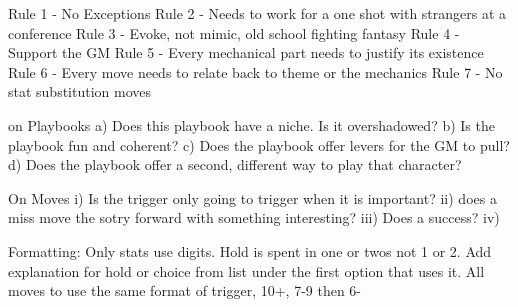 \documentclass{tufte-book}
\begin{document}
Rule 1 - No Exceptions
Rule 2 - Needs to work for a one shot with strangers at a conference
Rule 3 - Evoke, not mimic, old school fighting fantasy
Rule 4 - Support the GM
Rule 5 - Every mechanical part needs to justify its existence
Rule 6 - Every move needs to relate back to theme or the mechanics
Rule 7 - No stat substitution moves

on Playbooks
a) Does this playbook have a niche. Is it overshadowed?
b) Is the playbook fun and coherent?
c) Does the playbook offer levers for the GM to pull?
d) Does the playbook offer a second, different way to play that character?

On Moves
i) Is the trigger only going to trigger when it is important?
ii) does a miss move the sotry forward with something interesting?
iii) Does a success?
iv) 

Formatting:
Only stats use digits. Hold is spent in one or twos not 1 or 2. Add explanation for hold or choice from list under the first option that uses it.
All moves to use the same format of trigger, 10+, 7-9 then 6-









\backmatter




\printindex[stuff]

\printindex
\end{document}
